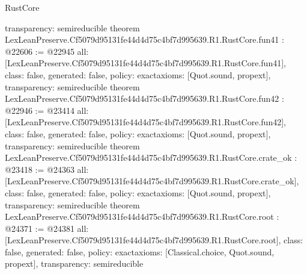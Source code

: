 \begin{lexlean}{RustCore}
\begin{coremodule}
{  transparency: semireducible
}
theorem LexLeanPreserve.Cf5079d95131fe44d4d75c4bf7d995639.R1.RustCore.fun41 : @22606 := @22945 {
  all: [LexLeanPreserve.Cf5079d95131fe44d4d75c4bf7d995639.R1.RustCore.fun41],
  class: false,
  generated: false,
  policy: exact{axioms: [Quot.sound, propext]},
  transparency: semireducible
}
theorem LexLeanPreserve.Cf5079d95131fe44d4d75c4bf7d995639.R1.RustCore.fun42 : @22946 := @23414 {
  all: [LexLeanPreserve.Cf5079d95131fe44d4d75c4bf7d995639.R1.RustCore.fun42],
  class: false,
  generated: false,
  policy: exact{axioms: [Quot.sound, propext]},
  transparency: semireducible
}
theorem LexLeanPreserve.Cf5079d95131fe44d4d75c4bf7d995639.R1.RustCore.crate_ok : @23418 := @24363 {
  all: [LexLeanPreserve.Cf5079d95131fe44d4d75c4bf7d995639.R1.RustCore.crate_ok],
  class: false,
  generated: false,
  policy: exact{axioms: [Quot.sound, propext]},
  transparency: semireducible
}
theorem LexLeanPreserve.Cf5079d95131fe44d4d75c4bf7d995639.R1.RustCore.root : @24371 := @24381 {
  all: [LexLeanPreserve.Cf5079d95131fe44d4d75c4bf7d995639.R1.RustCore.root],
  class: false,
  generated: false,
  policy: exact{axioms: [Classical.choice, Quot.sound, propext]},
  transparency: semireducible
}


\end{coremodule}
\end{lexlean}
